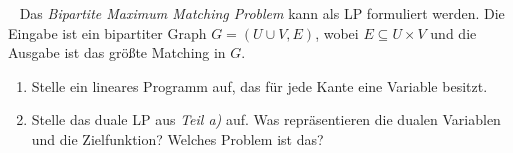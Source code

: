 \documentclass{uebung_cs}
\begin{document}
\begin{aufgabe}\
	Das \emph{Bipartite Maximum Matching Problem} kann als \acs{LP} formuliert werden. Die Eingabe ist ein bipartiter Graph $G = (U \cup V, E)$, wobei $E \subseteq U \times V$ und die Ausgabe ist das größte Matching in $G$.
	\begin{enumerate}
		\item Stelle ein lineares Programm auf, das für jede Kante eine Variable besitzt.
		\item Stelle das duale \acs{LP} aus \emph{Teil a)} auf. Was repräsentieren die dualen Variablen und die Zielfunktion? Welches Problem ist das?
	\end{enumerate}
\end{aufgabe}
\end{document}
